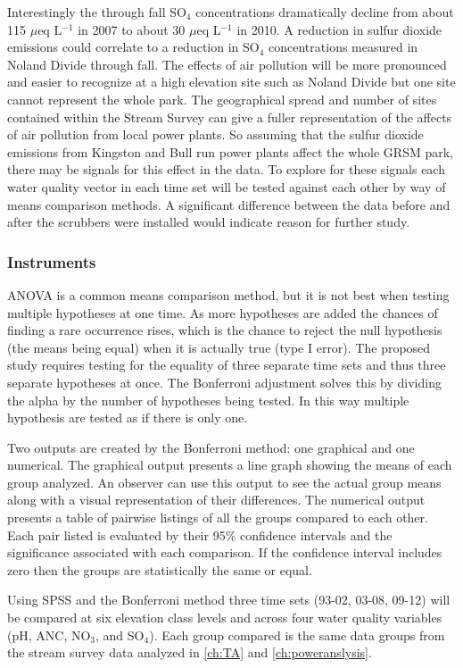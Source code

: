 Interestingly the through fall SO$_4$ concentrations dramatically decline from about 115 $\mu$eq L$^{-1}$ in 2007 to about 30 $\mu$eq L$^{-1}$ in 2010.
A reduction in sulfur dioxide emissions could correlate to a reduction in SO$_4$ concentrations measured in Noland Divide through fall.
The effects of air pollution will be more pronounced and easier to recognize at a high elevation site such as Noland Divide but one site cannot represent the whole park.
The geographical spread and number of sites contained within the Stream Survey can give a fuller representation of the affects of air pollution from local power plants.
So assuming that the sulfur dioxide emissions from Kingston and Bull run power plants affect the whole GRSM park, there may be signals for this effect in the data.
To explore for these signals each water quality vector in each time set will be tested against each other by way of means comparison methods.
A significant difference between the data before and after the scrubbers were installed would indicate reason for further study.

\subsubsection{Instruments}
ANOVA is a common means comparison method, but it is not best when testing multiple hypotheses at one time.
As more hypotheses are added the chances of finding a rare occurrence rises, which is the chance to reject the null hypothesis (the means being equal) when it is actually true (type I error).
The proposed study requires testing for the equality of three separate time sets and thus three separate hypotheses at once.
The Bonferroni adjustment solves this by dividing the alpha by the number of hypotheses being tested.
In this way multiple hypothesis are tested as if there is only one.

Two outputs are created by the Bonferroni method: one graphical and one numerical.
The graphical output presents a line graph showing the means of each group analyzed.
An observer can use this output to see the actual group means along with a visual representation of their differences.
The numerical output presents a table of pairwise listings of all the groups compared to each other.
Each pair listed is evaluated by their 95$\%$ confidence intervals and the significance associated with each comparison.
If the confidence interval includes zero then the groups are statistically the same or equal.

Using SPSS and the Bonferroni method three time sets (93-02, 03-08, 09-12) will be compared at six elevation class levels and across four water quality variables (pH, ANC, NO$_3$, and SO$_4 $).
Each group compared is the same data groups from the stream survey data analyzed in \autoref{ch:TA} and \autoref{ch:poweranslysis}.

